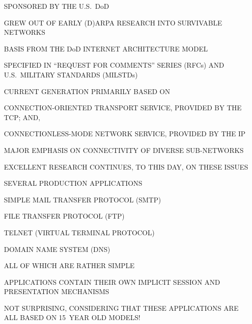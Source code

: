 \begin{bwslide}

\begin{nrtc}
\item	SPONSORED BY THE U.S.~DoD
    \begin{nrtc}
    \item	GREW OUT OF EARLY (D)ARPA RESEARCH INTO SURVIVABLE NETWORKS
    \end{nrtc}
    BASIS FROM THE DoD INTERNET ARCHITECTURE MODEL

\item	SPECIFIED IN ``REQUEST FOR COMMENTS'' SERIES (RFCs) AND
	U.S.~MILITARY STANDARDS (MILSTDs)

\item	CURRENT GENERATION PRIMARILY BASED ON
    \begin{nrtc}
    \item	CONNECTION-ORIENTED TRANSPORT SERVICE,
		PROVIDED BY THE TCP; AND,

    \item	CONNECTIONLESS-MODE NETWORK SERVICE,
		PROVIDED BY THE IP
    \end{nrtc}

\item	MAJOR EMPHASIS ON CONNECTIVITY OF DIVERSE SUB-NETWORKS
    \begin{nrtc}
    \item	EXCELLENT RESEARCH CONTINUES, TO THIS DAY, ON THESE ISSUES
    \end{nrtc}
\end{nrtc}
\end{bwslide}


\begin{bwslide}

\begin{nrtc}
\item	SEVERAL PRODUCTION APPLICATIONS
    \begin{nrtc}
    \item	SIMPLE MAIL TRANSFER PROTOCOL (SMTP)

    \item	FILE TRANSFER PROTOCOL (FTP)

    \item	TELNET (VIRTUAL TERMINAL PROTOCOL)

    \item	DOMAIN NAME SYSTEM (DNS)
    \end{nrtc}
    ALL OF WHICH ARE RATHER SIMPLE

\item	APPLICATIONS CONTAIN THEIR OWN IMPLICIT SESSION AND PRESENTATION
	MECHANISMS

\item	NOT SURPRISING, CONSIDERING THAT THESE APPLICATIONS ARE ALL BASED ON
	15~YEAR OLD MODELS!
\end{nrtc}
\end{bwslide}


